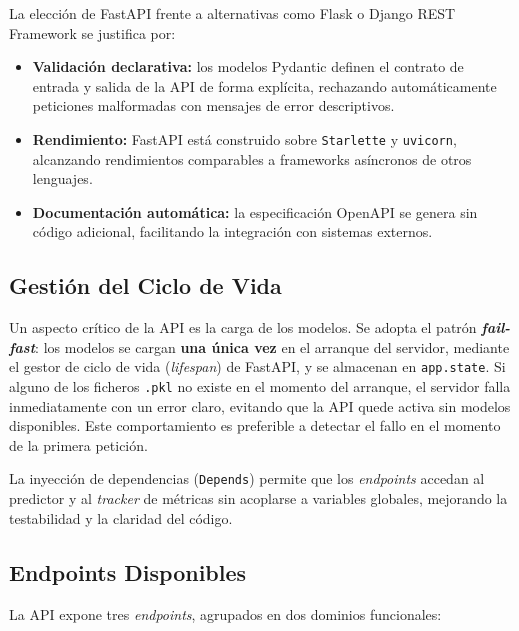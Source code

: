 La elección de FastAPI frente a alternativas como Flask o Django REST Framework se justifica por:

\begin{itemize}
    \item \textbf{Validación declarativa:} los modelos Pydantic definen el contrato de entrada y salida de la API de forma explícita, rechazando automáticamente peticiones malformadas con mensajes de error descriptivos.
    \item \textbf{Rendimiento:} FastAPI está construido sobre \texttt{Starlette} y \texttt{uvicorn}, alcanzando rendimientos comparables a frameworks asíncronos de otros lenguajes.
    \item \textbf{Documentación automática:} la especificación OpenAPI se genera sin código adicional, facilitando la integración con sistemas externos.
\end{itemize}

\subsection{Gestión del Ciclo de Vida}
\label{subsec:lifespan}

Un aspecto crítico de la API es la carga de los modelos. Se adopta el patrón \textbf{\textit{fail-fast}}: los modelos se cargan \textbf{una única vez} en el arranque del servidor, mediante el gestor de ciclo de vida (\textit{lifespan}) de FastAPI, y se almacenan en \texttt{app.state}. Si alguno de los ficheros \texttt{.pkl} no existe en el momento del arranque, el servidor falla inmediatamente con un error claro, evitando que la API quede activa sin modelos disponibles. Este comportamiento es preferible a detectar el fallo en el momento de la primera petición.

La inyección de dependencias (\texttt{Depends}) permite que los \textit{endpoints} accedan al predictor y al \textit{tracker} de métricas sin acoplarse a variables globales, mejorando la testabilidad y la claridad del código.

\subsection{Endpoints Disponibles}
\label{subsec:endpoints}

La API expone tres \textit{endpoints}, agrupados en dos dominios funcionales:

